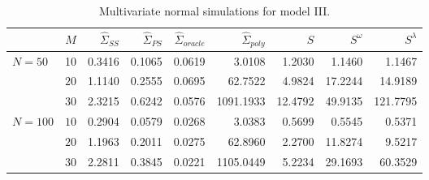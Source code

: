 \begin{table}[H]
\centering
\caption{Multivariate normal simulations for model III.} 
\begin{tabular}{lrrrrrrrr}
 & $M$ &$\hat{\Sigma}_{SS}$& $\hat{\Sigma}_{PS}$ &$\hat{\Sigma}_{oracle}$& $\hat{\Sigma}_{poly}$ & $S$ &$S^\omega$& $S^\lambda$ \\ 
   \hline
 $N = 50$ & 10 & 0.3416 & 0.1065 & 0.0619 & 3.0108 & 1.2030 & 1.1460 & 1.1467 \\ 
      & $20$ & 1.1140 & 0.2555 & 0.0695 & 62.7522 & 4.9824 & 17.2244 & 14.9189 \\ 
    & $30$ & 2.3215 & 0.6242 & 0.0576 & 1091.1933 & 12.4792 & 49.9135 & 121.7795 \\ 
     $N = 100$ & $10$ & 0.2904 & 0.0579 & 0.0268 & 3.0383 & 0.5699 & 0.5545 & 0.5371 \\ 
     & $20$ & 1.1963 & 0.2011 & 0.0275 & 62.8960 & 2.2700 & 11.8274 & 9.5217 \\ 
    & $30$ & 2.2811 & 0.3845 & 0.0221 & 1105.0449 & 5.2234 & 29.1693 & 60.3529 \\ 
   \hline
\end{tabular}
\label{table:simulation-1-entropy-loss-sigma-3}
\end{table}
